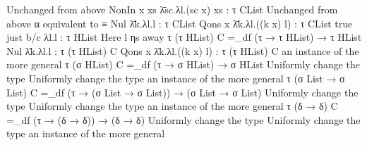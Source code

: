 \documentclass[screen,anonymous,review,draft,natbib=false]{acmart} %
\begin{document}
                                                                                                                  Unchanged from above                             NonIn x xs \= λsc.λl.(sc x) xs : τ CList        
                                                                                                                                                                   Unchanged from above                            
                                                                         α  equivalent to                                                                                                                          
                                                                         ≡                                        Nul \=  λk.λl.l : τ CList                        Qons x \= λk.λl.((k x) l)  : τ CList            
                                                                                                                  true just b/c λl.l : τ HList                     Here l ηs away                                  
 τ (τ HList) C =_df (τ → τ HList) → τ HList                                                                       Nul \=  λk.λl.l : τ (τ HList) C                  Qons x \= λk.λl.((k x) l)  : τ (τ HList) C      
                                                                         an instance of the more general                                                                                                           
 τ (σ HList) C =_df (τ → σ HList) → σ HList                                                                       Uniformly change the type                        Uniformly change the type                       
                                                                         an instance of the more general                                                                                                           
 τ (σ List → σ List) C =_df (τ → (σ List → σ List)) → (σ List → σ List)                                           Uniformly change the type                        Uniformly change the type                       
                                                                         an instance of the more general                                                                                                           
 τ (δ → δ) C =_df (τ → (δ → δ)) → (δ → δ)                                                                         Uniformly change the type                        Uniformly change the type                       
                                                                         an instance of the more general                                                                                                           
\end{document}
